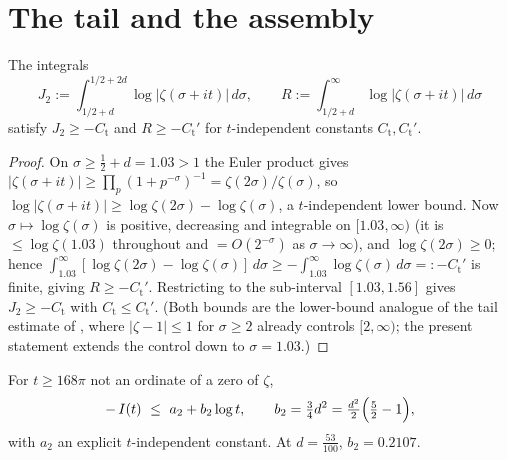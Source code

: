 \section{The tail and the assembly}
\label{sec:ll_assembly}

\begin{lemma}
\label{lem:ll_tail}
\leanok
{}
The integrals
\[
  J_2:=\int_{1/2+d}^{1/2+2d}\log|\zeta(\sigma+it)|\,d\sigma,\qquad
  R:=\int_{1/2+d}^{\infty}\log|\zeta(\sigma+it)|\,d\sigma
\]
satisfy $J_2\ge-C_{\mathrm t}$ and $R\ge-C_{\mathrm t}'$ for $t$-independent constants
$C_{\mathrm t},C_{\mathrm t}'$.
\end{lemma}

\begin{proof}
\leanok
{}
On $\sigma\ge\tfrac12+d=1.03>1$ the Euler product gives
$|\zeta(\sigma+it)|\ge\prod_p(1+p^{-\sigma})^{-1}=\zeta(2\sigma)/\zeta(\sigma)$, so
$\log|\zeta(\sigma+it)|\ge\log\zeta(2\sigma)-\log\zeta(\sigma)$, a $t$-independent lower
bound. Now $\sigma\mapsto\log\zeta(\sigma)$ is positive, decreasing and integrable on
$[1.03,\infty)$ (it is $\le\log\zeta(1.03)$ throughout and $=O(2^{-\sigma})$ as
$\sigma\to\infty$), and $\log\zeta(2\sigma)\ge0$; hence
$\int_{1.03}^\infty[\log\zeta(2\sigma)-\log\zeta(\sigma)]\,d\sigma\ge
-\int_{1.03}^\infty\log\zeta(\sigma)\,d\sigma=:-C_{\mathrm t}'$ is finite, giving
$R\ge-C_{\mathrm t}'$. Restricting to the sub-interval $[1.03,1.56]$ gives
$J_2\ge-C_{\mathrm t}$ with $C_{\mathrm t}\le C_{\mathrm t}'$. (Both bounds are the
lower-bound analogue of the tail estimate of , where
$|\zeta-1|\le1$ for $\sigma\ge2$ already controls $[2,\infty)$; the present statement
extends the control down to $\sigma=1.03$.)
\end{proof}

\begin{theorem}
\label{thm:ll_main}
\leanok
{}
For $t\ge168\pi$ not an ordinate of a zero of $\zeta$,
\[
  -\,I(t)\ \le\ a_2+b_2\log t,\qquad b_2=\tfrac34 d^2=\tfrac{d^2}2\Bigl(\tfrac52-1\Bigr),
\]
with $a_2$ an explicit $t$-independent constant. At $d=\tfrac{53}{100}$,
$b_2=0.2107$.
\end{theorem}

